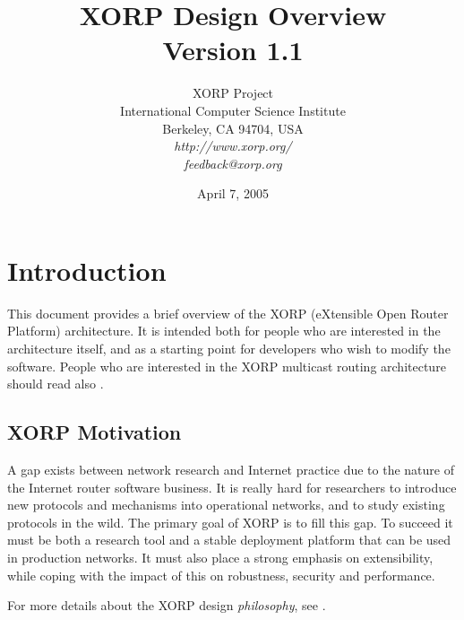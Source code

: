 \documentclass[11pt]{article}
\begin{document}
\title{XORP Design Overview \\
\vspace{1ex}
Version 1.1}
\author{ XORP Project					\\
	 International Computer Science Institute	\\
	 Berkeley, CA 94704, USA			\\
         {\it http://www.xorp.org/}			\\
	 {\it feedback@xorp.org}
}
\date{April 7, 2005}

\maketitle

\thispagestyle{empty}


\section{Introduction}

This document provides a brief overview of the XORP (eXtensible Open
Router Platform) architecture. It is intended both for people who are
interested in the architecture itself, and as a starting point for developers
who wish to modify the software.  People who are interested in the XORP
multicast routing architecture should read also
\cite{xorp:multicast_arch}.

\subsection{XORP Motivation}

A gap exists between network research and Internet practice due to the
nature of the Internet router software business.  It is really hard
for researchers to introduce new protocols and mechanisms into
operational networks, and to study existing protocols in the wild.
The primary goal of XORP is to fill this gap.  To succeed it must be both
a research tool and a stable deployment platform that can be used in
production networks.  It must also place a strong emphasis on
extensibility, while coping with the impact of this on robustness,
security and performance.

For more details about the XORP design {\it philosophy}, see
\cite{handley:hotnets2002:xorp}.

\end{document}

